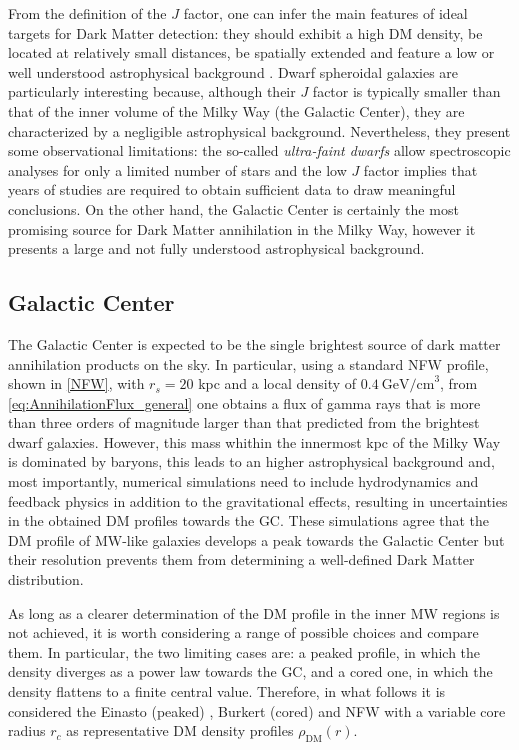 From the definition of the $J$ factor, one can infer the main features of ideal targets for Dark Matter detection: they should exhibit a high DM density, be located at relatively small distances, be spatially extended and feature a low or well understood astrophysical background \cite{hooper2018tasi}.
Dwarf spheroidal galaxies are particularly interesting because, although their $J$ factor is typically smaller than that of the inner volume of the Milky Way (the Galactic Center), they are characterized by a negligible astrophysical background. Nevertheless, they present some observational limitations: the so-called \emph{ultra-faint dwarfs} allow spectroscopic analyses for only a limited number of stars and the low $J$ factor implies that years of studies are required to obtain sufficient data to draw meaningful conclusions.
On the other hand, the Galactic Center is certainly the most promising source for Dark Matter annihilation in the Milky Way, however it presents a large and not fully understood astrophysical background.


\subsection{Galactic Center}

The Galactic Center is expected to be the single brightest source of dark matter annihilation products on the sky. In particular, using a standard NFW profile, shown in \cref{NFW}, with $r_s = 20$
kpc and a local density of $0.4~\text{GeV/cm}^3$, from \cref{eq:AnnihilationFlux_general} one obtains a flux of gamma rays that is more than three orders of magnitude larger than that predicted
from the brightest dwarf galaxies.
However, this mass whithin the innermost kpc of the Milky Way is dominated by baryons, 
this leads to an higher astrophysical background and, most importantly, numerical simulations need to include hydrodynamics
and feedback physics in addition to the gravitational effects, resulting in uncertainties in the obtained DM profiles towards the GC.
These simulations agree that the DM profile of MW-like galaxies develops a peak towards the Galactic Center but their resolution prevents them from determining a well-defined Dark Matter distribution.

As long as a clearer determination of the DM profile in the inner MW regions is not achieved, it is worth considering a range of possible choices and compare them. 
In particular, the two limiting cases are: a peaked profile, in which the density diverges as a power law towards the GC, and a cored one, in which the density flattens to a finite central value. 
Therefore, in what follows it is considered the Einasto (peaked) \cite{Einasto1965}, Burkert (cored) \cite{Burkert1995} 
and NFW \cite{NFW1996,NFW1997} with a variable core radius $r_c$ as representative DM density profiles 
$\rho_\mathrm{DM}(r)$.


